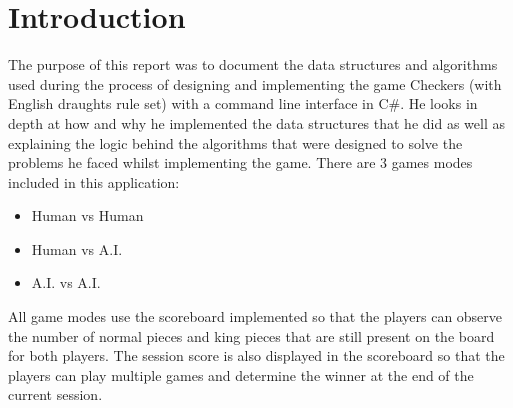 \documentclass[10pt, a4paper]{article}
\title{\mytitle}
\author{\myauthor\hspace{1em}\\\contact\\Edinburgh Napier University\hspace{0.5em}-\hspace{0.5em}\mymodule}
\date{}
\begin{document}
 \maketitle  
 
 \begin{abstract}
 \end{abstract}
 
 
 
 \section{Introduction}
 The purpose of this report was to document the data structures and algorithms used during the process of designing and implementing the game Checkers (with English draughts rule set) with a command line interface in C\#.
 \newline
 He looks in depth at how and why he implemented the data structures that he did as well as explaining the logic behind the algorithms that were designed to solve the problems he faced whilst implementing the game.
 \newline
 There are 3 games modes included in this application:
 
 \begin{itemize}
 	\item Human vs Human
 	\item Human vs A.I.
 	\item A.I. vs A.I.
 \end{itemize}
 
 All game modes use the scoreboard implemented so that the players can observe the number of normal pieces and king pieces that are still present on the board for both players. The session score is also displayed in the scoreboard so that the players can play multiple games and determine the winner at the end of the current session.
 
\end{document}
